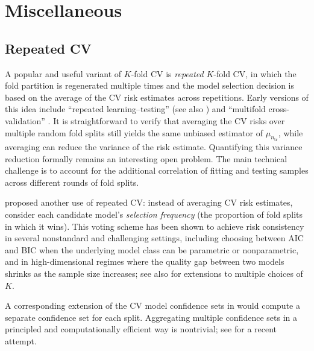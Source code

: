 \documentclass[11pt]{article}
\theoremstyle{plain}
\begin{document}
\newpage

\section{Miscellaneous}\label{sec:7-misc}
\subsection{Repeated CV}\label{subsec:7.1-rep-cv}
A popular and useful variant of \(K\)-fold CV is \emph{repeated} \(K\)-fold CV, in which the fold partition is regenerated multiple times and the model selection decision is based on the average of the CV risk estimates across repetitions. Early versions of this idea include ``repeated learning–testing'' \citep{burman1989comparative} (see also \cite{Geisser75}) and ``multifold cross-validation'' \citep{Zhang93}. It is straightforward to verify that averaging the CV risks over multiple random fold splits still yields the same unbiased estimator of \(\mu_{n_{\mathrm{tr}}}\), while averaging can reduce the variance of the risk estimate. Quantifying this variance reduction formally remains an interesting open problem. The main technical challenge is to account for the additional correlation of fitting and testing samples across different rounds of fold splits.

\cite{zhang2015cross} proposed another use of repeated CV: instead of averaging CV risk estimates, consider each candidate model’s \emph{selection frequency} (the proportion of fold splits in which it wins). This voting scheme has been shown to achieve risk consistency in several nonstandard and challenging settings, including choosing between AIC and BIC when the underlying model class can be parametric or nonparametric, and in high-dimensional regimes where the quality gap between two models shrinks as the sample size increases; see also \cite{zhan2022profile} for extensions to multiple choices of \(K\).

A corresponding extension of the CV model confidence sets in  would compute a separate confidence set for each split. Aggregating multiple confidence sets in a principled and computationally efficient way is nontrivial; see \cite{gasparin2024merging} for a recent attempt.
\end{document}
